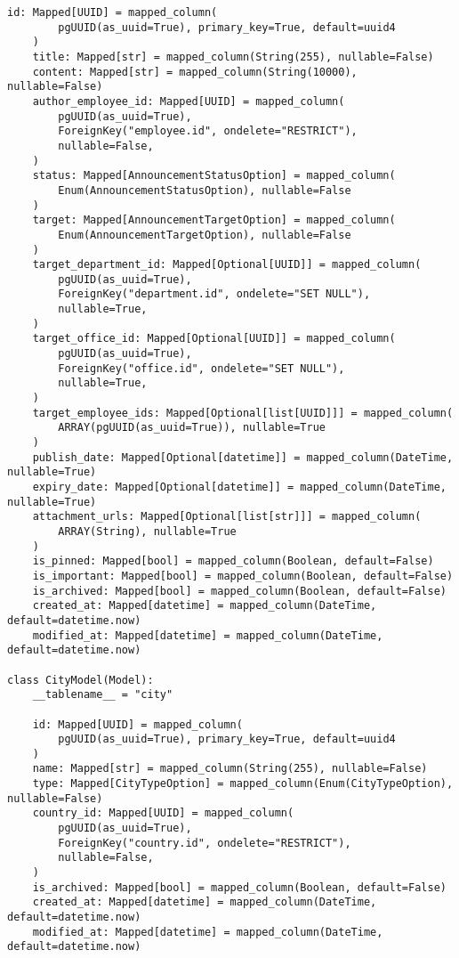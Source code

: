 \begin{lstlisting}[style=pythonstyle]
    id: Mapped[UUID] = mapped_column(
        pgUUID(as_uuid=True), primary_key=True, default=uuid4
    )
    title: Mapped[str] = mapped_column(String(255), nullable=False)
    content: Mapped[str] = mapped_column(String(10000), nullable=False)
    author_employee_id: Mapped[UUID] = mapped_column(
        pgUUID(as_uuid=True),
        ForeignKey("employee.id", ondelete="RESTRICT"),
        nullable=False,
    )
    status: Mapped[AnnouncementStatusOption] = mapped_column(
        Enum(AnnouncementStatusOption), nullable=False
    )
    target: Mapped[AnnouncementTargetOption] = mapped_column(
        Enum(AnnouncementTargetOption), nullable=False
    )
    target_department_id: Mapped[Optional[UUID]] = mapped_column(
        pgUUID(as_uuid=True),
        ForeignKey("department.id", ondelete="SET NULL"),
        nullable=True,
    )
    target_office_id: Mapped[Optional[UUID]] = mapped_column(
        pgUUID(as_uuid=True),
        ForeignKey("office.id", ondelete="SET NULL"),
        nullable=True,
    )
    target_employee_ids: Mapped[Optional[list[UUID]]] = mapped_column(
        ARRAY(pgUUID(as_uuid=True)), nullable=True
    )
    publish_date: Mapped[Optional[datetime]] = mapped_column(DateTime, nullable=True)
    expiry_date: Mapped[Optional[datetime]] = mapped_column(DateTime, nullable=True)
    attachment_urls: Mapped[Optional[list[str]]] = mapped_column(
        ARRAY(String), nullable=True
    )
    is_pinned: Mapped[bool] = mapped_column(Boolean, default=False)
    is_important: Mapped[bool] = mapped_column(Boolean, default=False)
    is_archived: Mapped[bool] = mapped_column(Boolean, default=False)
    created_at: Mapped[datetime] = mapped_column(DateTime, default=datetime.now)
    modified_at: Mapped[datetime] = mapped_column(DateTime, default=datetime.now)

class CityModel(Model):
    __tablename__ = "city"

    id: Mapped[UUID] = mapped_column(
        pgUUID(as_uuid=True), primary_key=True, default=uuid4
    )
    name: Mapped[str] = mapped_column(String(255), nullable=False)
    type: Mapped[CityTypeOption] = mapped_column(Enum(CityTypeOption), nullable=False)
    country_id: Mapped[UUID] = mapped_column(
        pgUUID(as_uuid=True),
        ForeignKey("country.id", ondelete="RESTRICT"),
        nullable=False,
    )
    is_archived: Mapped[bool] = mapped_column(Boolean, default=False)
    created_at: Mapped[datetime] = mapped_column(DateTime, default=datetime.now)
    modified_at: Mapped[datetime] = mapped_column(DateTime, default=datetime.now)


\end{lstlisting}
